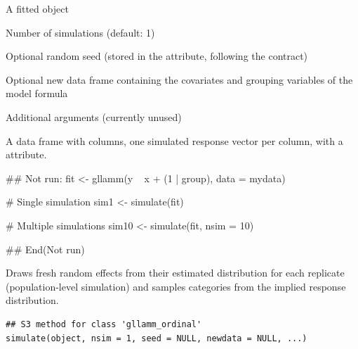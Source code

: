\documentclass[a4paper]{book}
\begin{document}
\begin{Arguments}
\begin{ldescription}
\item[\code{object}] A fitted  object

\item[\code{nsim}] Number of simulations (default: 1)

\item[\code{seed}] Optional random seed (stored in the  attribute,
following the  contract)

\item[\code{newdata}] Optional new data frame containing the covariates and
grouping variables of the model formula

\item[\code{...}] Additional arguments (currently unused)
\end{ldescription}
\end{Arguments}
%
\begin{Value}
A data frame with  columns, one simulated response
vector per column, with a  attribute.
\end{Value}
%
\begin{Examples}
\begin{ExampleCode}
## Not run: 
fit <- gllamm(y ~ x + (1 | group), data = mydata)

# Single simulation
sim1 <- simulate(fit)

# Multiple simulations
sim10 <- simulate(fit, nsim = 10)

## End(Not run)

\end{ExampleCode}
\end{Examples}
%
\begin{Description}
Draws fresh random effects from their estimated distribution for each
replicate (population-level simulation) and samples categories from the
implied response distribution.
\end{Description}
%
\begin{Usage}
\begin{verbatim}
## S3 method for class 'gllamm_ordinal'
simulate(object, nsim = 1, seed = NULL, newdata = NULL, ...)
\end{verbatim}
\end{Usage}
%
\end{document}
